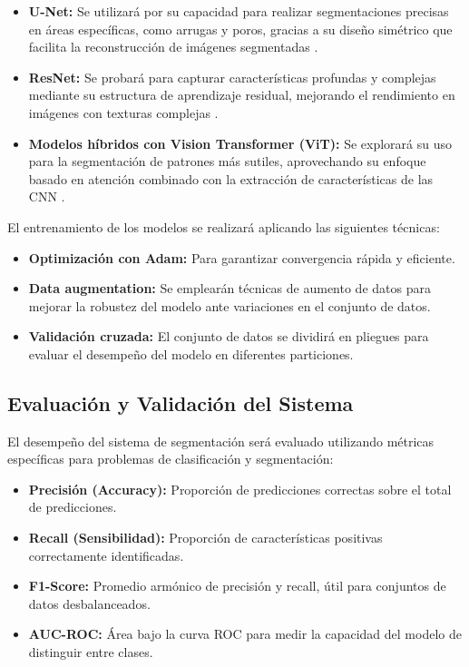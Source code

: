 \begin{itemize}
    \item \textbf{U-Net:} Se utilizará por su capacidad para realizar segmentaciones precisas en áreas específicas, como arrugas y poros, gracias a su diseño simétrico que facilita la reconstrucción de imágenes segmentadas \cite{ronneberger2015}.
    \item \textbf{ResNet:} Se probará para capturar características profundas y complejas mediante su estructura de aprendizaje residual, mejorando el rendimiento en imágenes con texturas complejas \cite{he2016}.
    \item \textbf{Modelos híbridos con Vision Transformer (ViT):} Se explorará su uso para la segmentación de patrones más sutiles, aprovechando su enfoque basado en atención combinado con la extracción de características de las CNN \cite{dosovitskiy2020}.
\end{itemize}

El entrenamiento de los modelos se realizará aplicando las siguientes técnicas:
\begin{itemize}
    \item \textbf{Optimización con Adam:} Para garantizar convergencia rápida y eficiente.
    \item \textbf{Data augmentation:} Se emplearán técnicas de aumento de datos para mejorar la robustez del modelo ante variaciones en el conjunto de datos.
    \item \textbf{Validación cruzada:} El conjunto de datos se dividirá en pliegues para evaluar el desempeño del modelo en diferentes particiones.
\end{itemize}

\subsection{Evaluación y Validación del Sistema}
El desempeño del sistema de segmentación será evaluado utilizando métricas específicas para problemas de clasificación y segmentación:
\begin{itemize}
    \item \textbf{Precisión (Accuracy):} Proporción de predicciones correctas sobre el total de predicciones.
    \item \textbf{Recall (Sensibilidad):} Proporción de características positivas correctamente identificadas.
    \item \textbf{F1-Score:} Promedio armónico de precisión y recall, útil para conjuntos de datos desbalanceados.
    \item \textbf{AUC-ROC:} Área bajo la curva ROC para medir la capacidad del modelo de distinguir entre clases.
\end{itemize}


